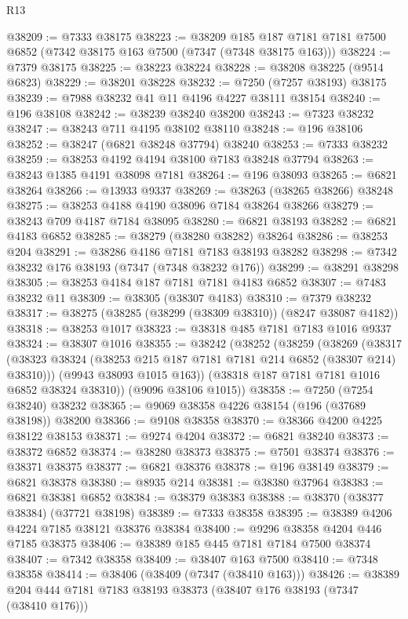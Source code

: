 \begin{lexlean}{R13}
\begin{coremodule}
@38209 := @7333 @38175
@38223 := @38209
    @185
    @187
    @7181
    @7181
    @7500
    @6852
    (@7342 @38175 @163 @7500 (@7347 (@7348 @38175 @163)))
@38224 := @7379 @38175
@38225 := @38223 @38224
@38228 := @38208 @38225 (@9514 @6823)
@38229 := @38201 @38228
@38232 := @7250 (@7257 @38193) @38175
@38239 := @7988 @38232 @41 @11 @4196 @4227 @38111 @38154
@38240 := @196 @38108
@38242 := @38239 @38240 @38200
@38243 := @7323 @38232
@38247 := @38243 @711 @4195 @38102 @38110
@38248 := @196 @38106
@38252 := @38247 (@6821 @38248 @37794) @38240
@38253 := @7333 @38232
@38259 := @38253 @4192 @4194 @38100 @7183 @38248 @37794
@38263 := @38243 @1385 @4191 @38098 @7181
@38264 := @196 @38093
@38265 := @6821 @38264
@38266 := @13933 @9337
@38269 := @38263 (@38265 @38266) @38248
@38275 := @38253 @4188 @4190 @38096 @7184 @38264 @38266
@38279 := @38243 @709 @4187 @7184 @38095
@38280 := @6821 @38193
@38282 := @6821 @4183 @6852
@38285 := @38279 (@38280 @38282) @38264
@38286 := @38253 @204
@38291 := @38286 @4186 @7181 @7183 @38193 @38282
@38298 := @7342 @38232 @176 @38193 (@7347 (@7348 @38232 @176))
@38299 := @38291 @38298
@38305 := @38253 @4184 @187 @7181 @7181 @4183 @6852
@38307 := @7483 @38232 @11
@38309 := @38305 (@38307 @4183)
@38310 := @7379 @38232
@38317 := @38275 (@38285 (@38299 (@38309 @38310)) (@8247 @38087 @4182))
@38318 := @38253 @1017
@38323 := @38318 @485 @7181 @7183 @1016 @9337
@38324 := @38307 @1016
@38355 := @38242
    (@38252
      (@38259
        (@38269
          (@38317 (@38323 @38324 (@38253 @215 @187 @7181 @7181 @214 @6852 (@38307 @214) @38310)))
          (@9943 @38093 @1015 @163))
        (@38318 @187 @7181 @7181 @1016 @6852 @38324 @38310))
      (@9096 @38106 @1015))
@38358 := @7250 (@7254 @38240) @38232
@38365 := @9069 @38358 @4226 @38154 (@196 (@37689 @38198)) @38200
@38366 := @9108 @38358
@38370 := @38366 @4200 @4225 @38122 @38153
@38371 := @9274 @4204
@38372 := @6821 @38240
@38373 := @38372 @6852
@38374 := @38280 @38373
@38375 := @7501 @38374
@38376 := @38371 @38375
@38377 := @6821 @38376
@38378 := @196 @38149
@38379 := @6821 @38378
@38380 := @8935 @214
@38381 := @38380 @37964
@38383 := @6821 @38381 @6852
@38384 := @38379 @38383
@38388 := @38370 (@38377 @38384) (@37721 @38198)
@38389 := @7333 @38358
@38395 := @38389 @4206 @4224 @7185 @38121 @38376 @38384
@38400 := @9296 @38358 @4204 @446 @7185 @38375
@38406 := @38389 @185 @445 @7181 @7184 @7500 @38374
@38407 := @7342 @38358
@38409 := @38407 @163 @7500
@38410 := @7348 @38358
@38414 := @38406 (@38409 (@7347 (@38410 @163)))
@38426 := @38389 @204 @444 @7181 @7183 @38193 @38373 (@38407 @176 @38193 (@7347 (@38410 @176)))

\end{coremodule}
\end{lexlean}
